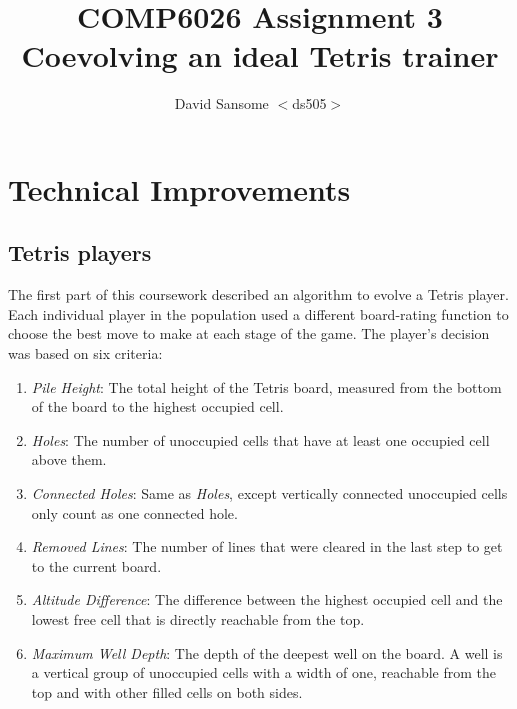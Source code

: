\documentclass[a4paper,11pt]{article}
\title{COMP6026 Assignment 3 \\
Coevolving an ideal Tetris trainer}
\author{David Sansome $<$ds505$>$}
\newcounter{savedcounter}
\begin{document}


\maketitle

\begin{abstract}



\end{abstract}

\clearpage
\tableofcontents

\section{Technical Improvements}

\subsection{Tetris players}

The first part of this coursework described an algorithm to evolve a Tetris
player.
Each individual player in the population used a different board-rating function
to choose the best move to make at each stage of the game.
The player's decision was based on six criteria:

\begin{enumerate}
  \item \emph{Pile Height}: The total height of the Tetris board, measured from
      the bottom of the board to the highest occupied cell.
  \item \emph{Holes}: The number of unoccupied cells that have at least one
      occupied cell above them.
  \item \emph{Connected Holes}: Same as \emph{Holes}, except vertically
      connected unoccupied cells only count as one connected hole.
  \item \emph{Removed Lines}: The number of lines that were cleared in the last
      step to get to the current board.
  \item \emph{Altitude Difference}: The difference between the highest occupied
      cell and the lowest free cell that is directly reachable from the top.
  \item \emph{Maximum Well Depth}: The depth of the deepest well on the board.
      A well is a vertical group of unoccupied cells with a width of one,
      reachable from the top and with other filled cells on both sides.
  \setcounter{savedcounter}{\theenumi}
\end{enumerate}
\end{document}
